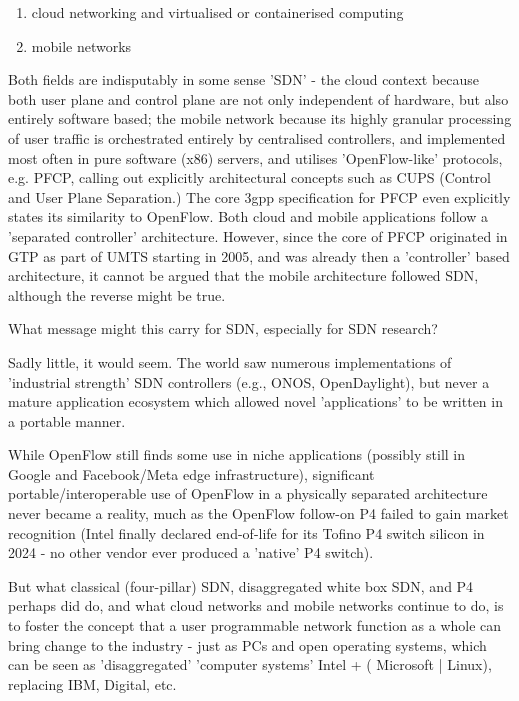 \begin{enumerate}
    \item cloud networking and virtualised or containerised computing
    \item mobile networks
\end{enumerate}

Both fields are indisputably in some sense 'SDN' - the cloud context because both user plane and control plane are not only independent of hardware, but also entirely software based; the mobile network because its highly granular processing of user traffic is orchestrated entirely by centralised controllers, and implemented most often in pure software (x86) servers, and utilises 'OpenFlow-like' protocols, e.g. PFCP, calling out explicitly architectural concepts such as CUPS (Control and User Plane Separation.)  The core 3gpp specification for PFCP even explicitly states its similarity to OpenFlow. Both cloud and mobile applications follow a 'separated controller' architecture.  However, since the core of PFCP originated in GTP as part of UMTS starting in 2005, and was already then a 'controller' based architecture, it cannot be argued that the mobile architecture followed SDN, although the reverse might be true.

What message might this carry for SDN, especially for SDN research?

Sadly little, it would seem.  The world saw numerous implementations of 'industrial strength'  SDN controllers (e.g., ONOS, OpenDaylight), but never a mature application ecosystem which allowed novel 'applications' to be written in a portable manner.

While OpenFlow still finds some use in niche applications (possibly still in Google and Facebook/Meta edge infrastructure), significant portable/interoperable use of OpenFlow in a physically separated architecture never became a reality, much as the OpenFlow follow-on P4 failed to gain market recognition (Intel finally declared end-of-life for its Tofino P4 switch silicon in 2024 - no other vendor ever produced a 'native' P4 switch).

But what classical (four-pillar) SDN, disaggregated white box SDN, and P4 perhaps did do, and what cloud networks and mobile networks continue to do, is to foster the concept that a user programmable network function as a whole can bring change to the industry - just as PCs and open operating systems, which can be seen as 'disaggregated' 'computer systems' Intel + ( Microsoft | Linux), replacing IBM, Digital, etc.

